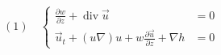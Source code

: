 
\begin{equation*}
 (1)\quad\left\{
 \begin{aligned}
 \frac{\partial w}{\partial z}+\operatorname{div}\vec u&=0\\
 \vec u_t+(u\nabla)u+w\frac{\partial\vec u}{\partial z}+\nabla h&=0
 \end{aligned}\right.
\end{equation*}

